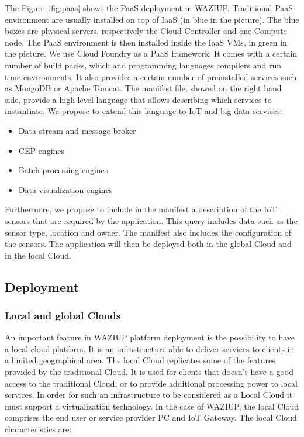 The Figure~\ref{fig:paas} shows the PaaS deployment in WAZIUP.
Traditional PaaS environment are usually installed on top of IaaS (in blue in the picture).
The blue boxes are physical servers, respectively the Cloud Controller and one Compute node.
The PaaS environment is then installed inside the IaaS VMs, in green in the picture.
We use Cloud Foundry as a PaaS framework.
It comes with a certain number of build packs, which and programming languages compilers and run time environments.
It also provides a certain number of preinstalled services such as MongoDB or Apache Tomcat.
The manifest file, showed on the right hand side, provide a high-level language that allows describing which services to instantiate.
We propose to extend this language to IoT and big data services:
\begin{itemize}
  \item Data stream and message broker
  \item CEP engines
  \item Batch processing engines
  \item Data visualization engines
\end{itemize}

Furthermore, we propose to include in the manifest a description of the IoT sensors that are required by the application.
This query includes data such as the sensor type, location and owner.
The manifest also includes the configuration of the sensors.
The application will then be deployed both in the global Cloud and in the local Cloud.

\subsection{Deployment}
\subsubsection{Local and global Clouds}

An important feature in WAZIUP platform deployment is the possibility to have a local cloud platform. 
It  is an infrastructure able to deliver services to clients in a limited geographical area. 
The local Cloud replicates some of the features provided by the traditional Cloud. 
It is used for clients that doesn't have a good access to the traditional Cloud, or to provide additional processing power to local services. 
In order for such an infrastructure to be considered as a Local Cloud it must support a virtualization technology. 
In the case of WAZIUP, the local Cloud comprises the end user or service provider PC and IoT Gateway. 
The local Cloud characteristics are:

